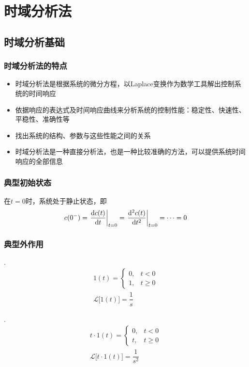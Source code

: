 \chapter{时域分析法}
\thispagestyle{empty}
\section{时域分析基础}
 \subsection{时域分析法的特点}
 \begin{itemize}
 	\item 时域分析法是根据系统的微分方程，以Laplace变换作为数学工具解出控制系统的时间响应
 	\item 依据响应的表达式及时间响应曲线来分析系统的控制性能：稳定性、快速性、平稳性、准确性等
 	\item 找出系统的结构、参数与这些性能之间的关系
 	\item 时域分析法是一种直接分析法，也是一种比较准确的方法，可以提供系统时间响应的全部信息
 \end{itemize}
 
 \subsection{典型初始状态}
在$t = 0$时，系统处于静止状态，即
\begin{align}
	c(0^-) = \left.\dfrac{{\rm{d}} c(t)}{{\rm{d}} t}\right|_{t = 0} = \left. \dfrac{{\rm{d}}^2 c(t)}{{\rm{d}} t^2}\right|_{t=0} = \cdots = 0
\end{align}

\subsection{典型外作用}
. 
\begin{align}
	1(t) = 
	\begin{cases}
		0, & t<0 \\
		1, & t \ge 0
	\end{cases}\\[0.5em]
\mathcal{L}\big[1(t)\big] = \dfrac{1}{s}
\end{align}

. 
\begin{align}
	t \cdot 1(t) = 
	\begin{cases}
		0, & t<0 \\
		t, & t \ge 0
	\end{cases}\\[0.5em]
	\mathcal{L}\big[t \cdot 1(t)\big] = \dfrac{1}{s^2}
\end{align}

